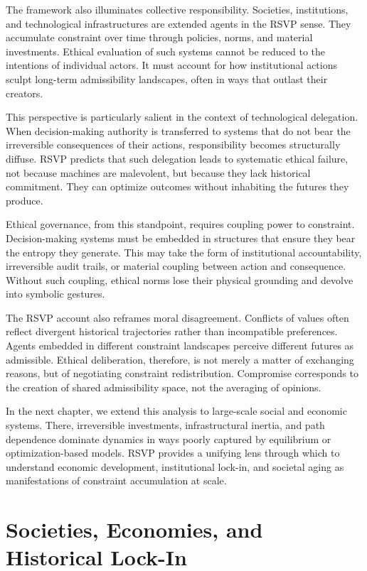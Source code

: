 \documentclass[11pt,oneside]{book}
\begin{document}
The framework also illuminates collective responsibility. Societies, institutions, and technological infrastructures are extended agents in the RSVP sense. They accumulate constraint over time through policies, norms, and material investments. Ethical evaluation of such systems cannot be reduced to the intentions of individual actors. It must account for how institutional actions sculpt long-term admissibility landscapes, often in ways that outlast their creators.

This perspective is particularly salient in the context of technological delegation. When decision-making authority is transferred to systems that do not bear the irreversible consequences of their actions, responsibility becomes structurally diffuse. RSVP predicts that such delegation leads to systematic ethical failure, not because machines are malevolent, but because they lack historical commitment. They can optimize outcomes without inhabiting the futures they produce.

Ethical governance, from this standpoint, requires coupling power to constraint. Decision-making systems must be embedded in structures that ensure they bear the entropy they generate. This may take the form of institutional accountability, irreversible audit trails, or material coupling between action and consequence. Without such coupling, ethical norms lose their physical grounding and devolve into symbolic gestures.

The RSVP account also reframes moral disagreement. Conflicts of values often reflect divergent historical trajectories rather than incompatible preferences. Agents embedded in different constraint landscapes perceive different futures as admissible. Ethical deliberation, therefore, is not merely a matter of exchanging reasons, but of negotiating constraint redistribution. Compromise corresponds to the creation of shared admissibility space, not the averaging of opinions.

In the next chapter, we extend this analysis to large-scale social and economic systems. There, irreversible investments, infrastructural inertia, and path dependence dominate dynamics in ways poorly captured by equilibrium or optimization-based models. RSVP provides a unifying lens through which to understand economic development, institutional lock-in, and societal aging as manifestations of constraint accumulation at scale.

\chapter{Societies, Economies, and Historical Lock-In}
\end{document}
